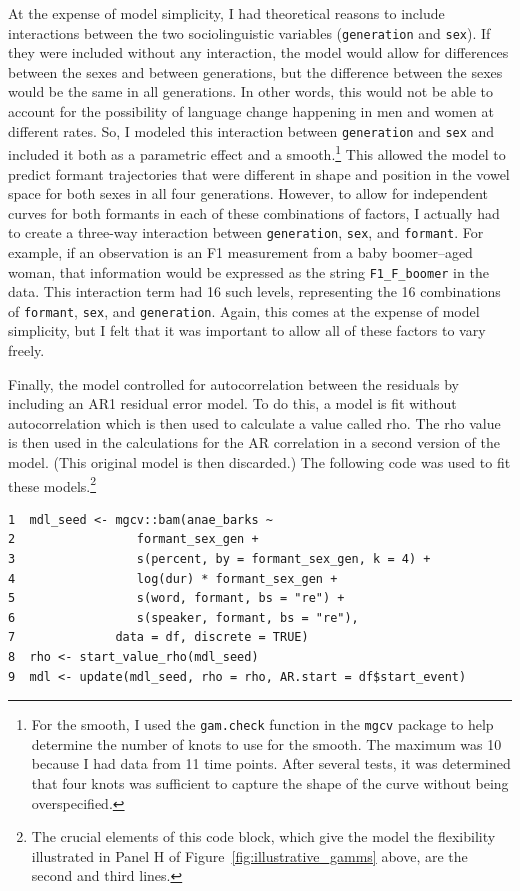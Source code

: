 At the expense of model simplicity, I had theoretical reasons to include interactions between the two sociolinguistic variables (\texttt{generation} and \texttt{sex}). If they were included without any interaction, the model would allow for differences between the sexes and between generations, but the difference between the sexes would be the same in all generations. In other words, this would not be able to account for the possibility of language change happening in men and women at different rates. So, I modeled this interaction between \texttt{generation} and \texttt{sex} and included it both as a parametric effect and a smooth.\footnote{For the smooth, I used the \texttt{gam.check} function in the \texttt{mgcv} package to help determine the number of knots to use for the smooth. The maximum was 10 because I had data from 11 time points. After several tests, it was determined that four knots was sufficient to capture the shape of the curve without being overspecified.} This allowed the model to predict formant trajectories that were different in shape and position in the vowel space for both sexes in all four generations. However, to allow for independent curves for both formants in each of these combinations of factors, I actually had to create a three-way interaction between \texttt{generation}, \texttt{sex}, and \texttt{formant}. For example, if an observation is an F1 measurement from a baby boomer–aged woman, that information would be expressed as the string \texttt{F1\_F\_boomer} in the data. This interaction term had 16 such levels, representing the 16 combinations of \texttt{formant}, \texttt{sex}, and \texttt{generation}. Again, this comes at the expense of model simplicity, but I felt that it was important to allow all of these factors to vary freely.

Finally, the model controlled for autocorrelation between the residuals by including an AR1 residual error model. To do this, a model is fit without autocorrelation which is then used to calculate a value called rho. The rho value is then used in the calculations for the AR correlation in a second version of the model. (This original model is then discarded.) The following code was used to fit these models.\footnote{The crucial elements of this code block, which give the model the flexibility illustrated in Panel H of Figure~\ref{fig:illustrative_gamms} above, are the second and third lines.}

\begin{verbatim}
1  mdl_seed <- mgcv::bam(anae_barks ~
2                 formant_sex_gen +
3                 s(percent, by = formant_sex_gen, k = 4) +
4                 log(dur) * formant_sex_gen +
5                 s(word, formant, bs = "re") +
6                 s(speaker, formant, bs = "re"),
7              data = df, discrete = TRUE)
8  rho <- start_value_rho(mdl_seed)
9  mdl <- update(mdl_seed, rho = rho, AR.start = df$start_event)
\end{verbatim}


